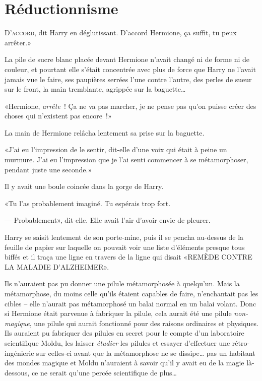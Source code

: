 \chapter{Réductionnisme}

\lettrine[ante=«]{D}{'accord}, dit Harry en déglutissant. D'accord Hermione, ça suffit, tu peux arrêter.»

La pile de sucre blanc placée devant Hermione n'avait changé ni de forme ni de couleur, et pourtant elle s'était concentrée avec plus de force que Harry ne l'avait jamais vue le faire, ses paupières serrées l'une contre l'autre, des perles de sueur sur le front, la main tremblante, agrippée sur la baguette…

«Hermione, \emph{arrête}~! Ça ne va pas marcher, je ne pense pas qu'on puisse créer des choses qui n'existent pas encore~!»

La main de Hermione relâcha lentement sa prise sur la baguette.

«J'ai eu l'impression de le sentir, dit-elle d'une voix qui était à peine un murmure. J'ai eu l'impression que je l'ai senti commencer à se métamorphoser, pendant juste une seconde.»

Il y avait une boule coincée dans la gorge de Harry.

«Tu l'as probablement imaginé. Tu espérais trop fort.

--- Probablement», dit-elle. Elle avait l'air d'avoir envie de pleurer.

Harry se saisit lentement de son porte-mine, puis il se pencha au-dessus de la feuille de papier sur laquelle on pouvait voir une liste d'éléments presque tous biffés et il traça une ligne en travers de la ligne qui disait «REMÈDE CONTRE LA MALADIE D'ALZHEIMER».

Ils n'auraient pas pu donner une pilule métamorphosée à quelqu'un. Mais la métamorphose, du moins celle qu'ils étaient capables de faire, n'enchantait pas les cibles -- elle n'aurait pas métamorphosé un balai normal en un balai volant. Donc si Hermione était parvenue à fabriquer la pilule, cela aurait été une pilule \emph{non-magique}, une pilule qui aurait fonctionné pour des raisons ordinaires et physiques. Ils auraient pu fabriquer des pilules en secret pour le compte d'un laboratoire scientifique Moldu, les laisser \emph{étudier} les pilules et essayer d'effectuer une rétro-ingénierie sur celles-ci avant que la métamorphose ne se dissipe… pas un habitant des mondes magique et Moldu n'auraient à savoir qu'il y avait eu de la magie là-dessous, ce ne serait qu'une percée scientifique de plus…

